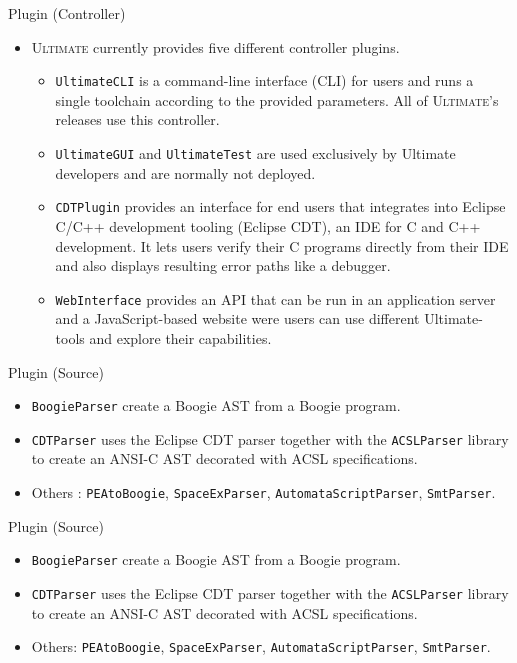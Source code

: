 \documentclass[12pt]{beamer}
\newcommand{\code}[1]{\texttt{#1}}
\newcommand{\ultimate}{\textsc{Ultimate }}
\newcommand{\ultimates}{\textsc{Ultimate}'s }
\begin{document}
\begin{frame}{Plugin (Controller)}
	\begin{itemize}
		\item \ultimate currently provides five different controller plugins.
		\begin{itemize}
			\item \code{UltimateCLI} is a command-line interface (CLI) for users and runs a single toolchain according to the provided parameters. All of \ultimates releases use this controller.
			\item \code{UltimateGUI} and \code{UltimateTest} are used exclusively by Ultimate developers and are normally not deployed.
			\item \code{CDTPlugin} provides an interface for end users that integrates into Eclipse C/C++ development tooling (Eclipse CDT), an IDE for C and C++ development. It lets users verify their C programs directly from their IDE and also displays resulting error paths like a debugger.
			\item \code{WebInterface} provides an API that can be run in an application server and a JavaScript-based website were users can use different Ultimate-tools and explore their capabilities.
		\end{itemize}
	\end{itemize}
\end{frame}

\begin{frame}{Plugin (Source)}
	\begin{itemize}
		\item \code{BoogieParser} create a Boogie AST from a Boogie program.
		\item \code{CDTParser} uses the Eclipse CDT parser together with the \code{ACSLParser} library to create an ANSI-C AST decorated with ACSL specifications. 
		\item Others : \code{PEAtoBoogie}, \code{SpaceExParser}, \code{AutomataScriptParser}, \code{SmtParser}.
	\end{itemize}
\end{frame}

\begin{frame}{Plugin (Source)}
	\begin{itemize}
		\item \code{BoogieParser} create a Boogie AST from a Boogie program.
		\item \code{CDTParser} uses the Eclipse CDT parser together with the \code{ACSLParser} library to create an ANSI-C AST decorated with ACSL specifications. 
		\item Others: \code{PEAtoBoogie}, \code{SpaceExParser}, \code{AutomataScriptParser}, \code{SmtParser}.
	\end{itemize}
\end{frame}
\end{document}
